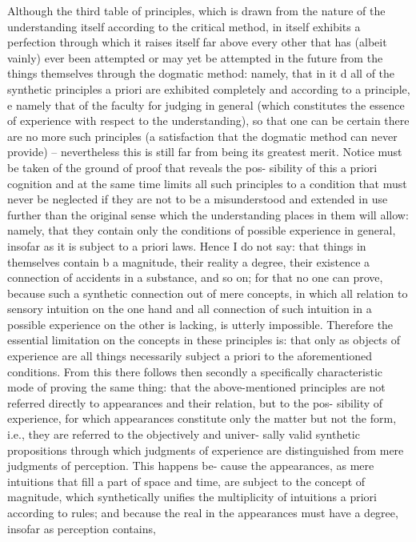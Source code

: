 Although the third table of principles, which is drawn from the nature of
the understanding itself according to the critical method, in itself exhibits
a perfection through which it raises itself far above every other that
has (albeit vainly) ever been attempted or may yet be attempted in the
future from the things themselves through the dogmatic method: namely,
that in it d all of the synthetic principles a priori are exhibited completely
and according to a principle, e namely that of the faculty for judging
in general (which constitutes the essence of experience with respect to
the understanding), so that one can be certain there are no more such
principles (a satisfaction that the dogmatic method can never provide) –
nevertheless this is still far from being its greatest merit.
Notice must be taken of the ground of proof that reveals the pos-
sibility of this a priori cognition and at the same time limits all such
principles to a condition that must never be neglected if they are not to
be a misunderstood and extended in use further than the original sense
which the understanding places in them will allow: namely, that they
contain only the conditions of possible experience in general, insofar as
it is subject to a priori laws. Hence I do not say: that things in themselves
contain b a magnitude, their reality a degree, their existence a connection
of accidents in a substance, and so on; for that no one can prove, because
such a synthetic connection out of mere concepts, in which all relation
to sensory intuition on the one hand and all connection of such intuition
in a possible experience on the other is lacking, is utterly impossible.
Therefore the essential limitation on the concepts in these principles is:
that only as objects of experience are all things necessarily subject a priori
to the aforementioned conditions.
From this there follows then secondly a speciﬁcally characteristic
mode of proving the same thing: that the above-mentioned principles
are not referred directly to appearances and their relation, but to the pos-
sibility of experience, for which appearances constitute only the matter
but not the form, i.e., they are referred to the objectively and univer-
sally valid synthetic propositions through which judgments of experience
are distinguished from mere judgments of perception. This happens be-
cause the appearances, as mere intuitions that ﬁll a part of space and time,
are subject to the concept of magnitude, which synthetically uniﬁes the
multiplicity of intuitions a priori according to rules; and because the real
in the appearances must have a degree, insofar as perception contains,
